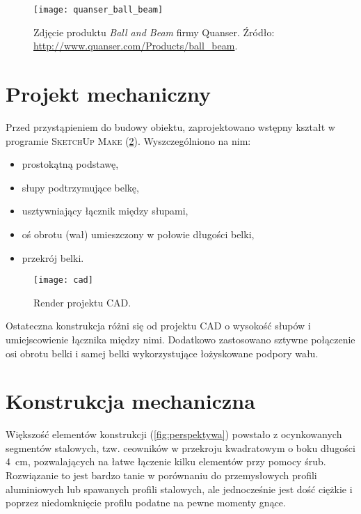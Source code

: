 \begin{figure}[H]
	\centering
	\texttt{[image: quanser\_ball\_beam]}
	\caption{Zdjęcie produktu \textit{Ball and Beam} firmy Quanser. Źródło: \url{http://www.quanser.com/Products/ball_beam}.}
	\label{fig:quanser_ball_beam}
\end{figure}

\section{Projekt mechaniczny}

Przed przystąpieniem do budowy obiektu, zaprojektowano wstępny kształt w programie  \textsc{SketchUp Make} (\cref{fig:cad_render}). Wyszczególniono na nim:

\begin{itemize}
	\item prostokątną podstawę,
	\item słupy podtrzymujące belkę,
	\item usztywniający łącznik między słupami,
	\item oś obrotu (wał) umieszczony w połowie długości belki,
	\item przekrój belki.
\end{itemize}

\begin{figure}[H]
	\centering
	\texttt{[image: cad]}
	\caption{Render projektu CAD.}
	\label{fig:cad_render}
\end{figure}

Ostateczna konstrukcja różni się od projektu \textsc{CAD} o wysokość słupów i umiejscowienie łącznika między nimi. Dodatkowo zastosowano sztywne połączenie osi obrotu belki i samej belki wykorzystujące łożyskowane podpory wału.

\section{Konstrukcja mechaniczna}
\label{sec:ch2_konstrukcja_mechaniczna}

Większość elementów konstrukcji (\cref{fig:perspektywa}) powstało z ocynkowanych segmentów stalowych, tzw. ceowników w przekroju kwadratowym o boku długości \SI{4}{cm}, pozwalających na łatwe łączenie kilku elementów przy pomocy śrub. Rozwiązanie to jest bardzo tanie w porównaniu do przemysłowych profili aluminiowych lub spawanych profili stalowych, ale jednocześnie jest dość ciężkie i poprzez niedomknięcie profilu podatne na pewne momenty gnące.

